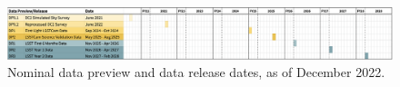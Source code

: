 \begin{figure}
\includegraphics[width=\linewidth]{figures/DPR-timeline}
\caption{Nominal data preview and data release dates, as of December 2022.}
\label{fig:timeline}
\end{figure}

%
%
%
%
%
%
%
%
